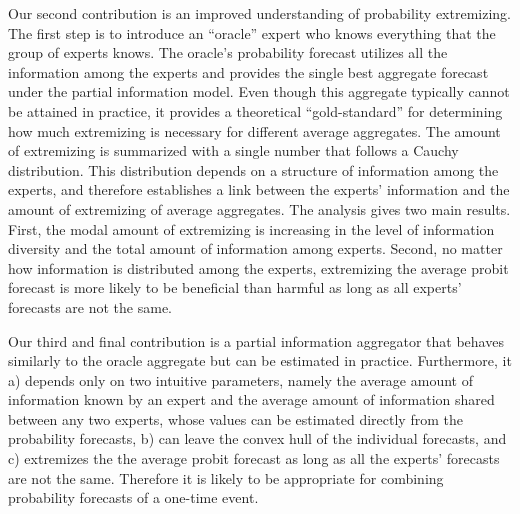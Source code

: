 \documentclass[11pt]{article}
\theoremstyle{definition}
\theoremstyle{definition}
\begin{document}
Our second contribution is an improved understanding of probability extremizing. The first step is to introduce an ``oracle'' expert who knows everything that the group of experts knows. The oracle's probability forecast  utilizes all the information among the experts and provides the single best aggregate forecast under the partial information model. Even though this aggregate typically cannot be attained in practice, it provides a theoretical ``gold-standard'' for determining how much extremizing is necessary for different average aggregates. The amount of extremizing is summarized with a single number that follows a Cauchy distribution. This distribution depends on a structure of information among the experts, and therefore 
establishes a link between the experts' information and the amount of extremizing of average aggregates. The analysis gives two main results. First, the modal amount of extremizing is increasing in the level of information diversity and the total amount of information among experts. Second, no matter how information is distributed among the experts, extremizing the average probit forecast is more likely to be beneficial than harmful as long as all experts' forecasts are not the same. 



Our third and final contribution is a partial information aggregator that behaves similarly to the oracle aggregate but can be estimated in practice. Furthermore, it a) depends only on two intuitive parameters, namely the average amount of information known by an expert and the average amount of information shared between any two experts, whose values can be estimated directly from the probability forecasts, b) can leave the convex hull of the individual forecasts, and c) extremizes the the average probit forecast as long as all the experts' forecasts are not the same.  Therefore it is likely to be appropriate for combining probability forecasts of a one-time event.


\end{document}
